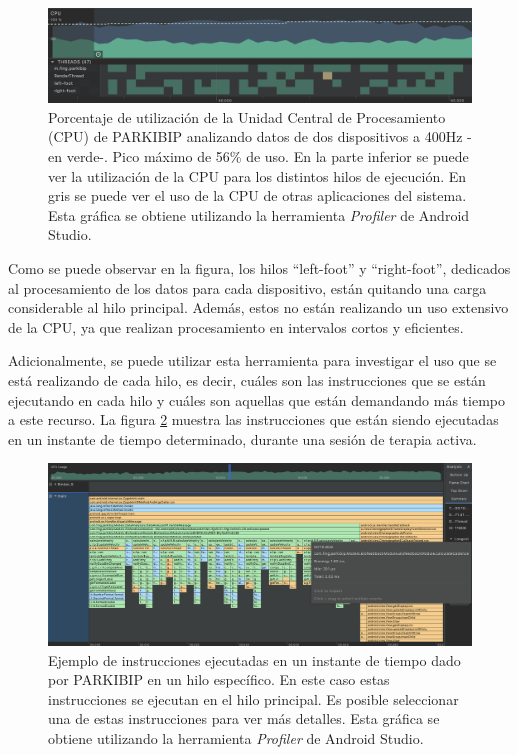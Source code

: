 \begin{figure}[H]
\centering
\includegraphics[width=\textwidth]{TESIS/imagenes/chap06/cpu-usage-general.png}
\caption{Porcentaje de utilización de la Unidad Central de Procesamiento (CPU) de PARKIBIP analizando datos de dos dispositivos a 400Hz -en verde-. Pico máximo de 56\% de uso. En la parte inferior se puede ver la utilización de la CPU para los distintos hilos de ejecución. En gris se puede ver el uso de la CPU de otras aplicaciones del sistema. Esta gráfica se obtiene utilizando la herramienta \textit{Profiler} de Android Studio.}
\label{FIG:CPU-usage}
\end{figure}

Como se puede observar en la figura, los hilos ``left-foot'' y ``right-foot'', dedicados al procesamiento de los datos para cada dispositivo, están quitando una carga considerable al hilo principal. Además, estos no están realizando un uso extensivo de la CPU, ya que realizan procesamiento en intervalos cortos y eficientes. 

Adicionalmente, se puede utilizar esta herramienta para investigar el uso que se está realizando de cada hilo, es decir, cuáles son las instrucciones que se están ejecutando en cada hilo y cuáles son aquellas que están demandando más tiempo a este recurso. La figura \ref{FIG:cpu-usage-threads} muestra las instrucciones que están siendo ejecutadas en un instante de tiempo determinado, durante una sesión de terapia activa.

\newpage

\begin{figure}[H]
\hspace{-2.0cm}
\includegraphics[clip,width=1.3 \columnwidth]{TESIS/imagenes/chap06/cpu-usage-threads.png}
\caption{Ejemplo de instrucciones ejecutadas en un instante de tiempo dado por PARKIBIP en un hilo específico. En este caso estas instrucciones se ejecutan en el hilo principal. Es posible seleccionar una de estas instrucciones para ver más detalles. Esta gráfica se obtiene utilizando la herramienta \textit{Profiler} de Android Studio.} 
\label{FIG:cpu-usage-threads}
\end{figure}

